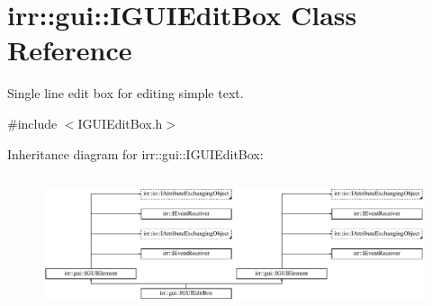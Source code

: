\hypertarget{classirr_1_1gui_1_1IGUIEditBox}{}\section{irr\+:\+:gui\+:\+:I\+G\+U\+I\+Edit\+Box Class Reference}
\label{classirr_1_1gui_1_1IGUIEditBox}


Single line edit box for editing simple text.  




{\ttfamily \#include $<$I\+G\+U\+I\+Edit\+Box.\+h$>$}

Inheritance diagram for irr\+:\+:gui\+:\+:I\+G\+U\+I\+Edit\+Box\+:\begin{figure}[H]
\begin{center}
\leavevmode
\includegraphics[height=4.038462cm]{classirr_1_1gui_1_1IGUIEditBox}
\end{center}
\end{figure}
